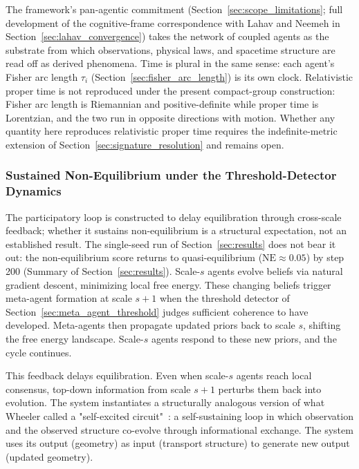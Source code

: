 \documentclass[11pt]{article}
\begin{document}
The framework's pan-agentic commitment (Section~\ref{sec:scope_limitations}; full development of the cognitive-frame correspondence with Lahav and Neemeh in Section~\ref{sec:lahav_convergence}) takes the network of coupled agents as the substrate from which observations, physical laws, and spacetime structure are read off as derived phenomena. Time is plural in the same sense: each agent's Fisher arc length $\tau_i$ (Section~\ref{sec:fisher_arc_length}) is its own clock. Relativistic proper time is not reproduced under the present compact-group construction: Fisher arc length is Riemannian and positive-definite while proper time is Lorentzian, and the two run in opposite directions with motion. Whether any quantity here reproduces relativistic proper time requires the indefinite-metric extension of Section~\ref{sec:signature_resolution} and remains open.

\subsubsection{Sustained Non-Equilibrium under the Threshold-Detector Dynamics}

The participatory loop is constructed to delay equilibration through cross-scale feedback; whether it sustains non-equilibrium is a structural expectation, not an established result. The single-seed run of Section~\ref{sec:results} does not bear it out: the non-equilibrium score returns to quasi-equilibrium ($\mathrm{NE} \approx 0.05$) by step 200 (Summary of Section~\ref{sec:results}). Scale-$s$ agents evolve beliefs via natural gradient descent, minimizing local free energy. These changing beliefs trigger meta-agent formation at scale $s+1$ when the threshold detector of Section~\ref{sec:meta_agent_threshold} judges sufficient coherence to have developed. Meta-agents then propagate updated priors back to scale $s$, shifting the free energy landscape. Scale-$s$ agents respond to these new priors, and the cycle continues.

This feedback delays equilibration. Even when scale-$s$ agents reach local consensus, top-down information from scale $s+1$ perturbs them back into evolution. The system instantiates a structurally analogous version of what Wheeler called a "self-excited circuit"~\cite{Wheeler1983}: a self-sustaining loop in which observation and the observed structure co-evolve through informational exchange. The system uses its output (geometry) as input (transport structure) to generate new output (updated geometry).
\end{document}
